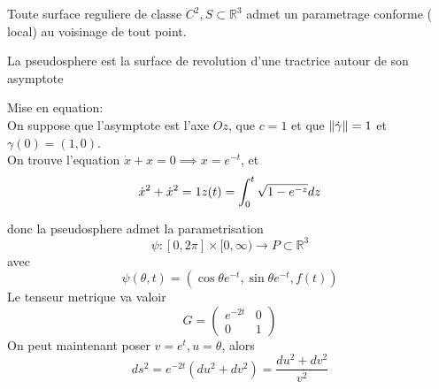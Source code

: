 \documentclass[../main.tex]{subfiles}
\begin{document}
\begin{thm}
	Toute surface reguliere de classe $C^{2}, S \subset \mathbb{R}^{3}$ admet un parametrage conforme ( local) au voisinage de tout point.
\end{thm}
\begin{defn}[Pseudosphere]
	La pseudosphere est la surface de revolution d'une tractrice autour de son asymptote
\end{defn}
Mise en equation:\\
On suppose que l'asymptote est l'axe $Oz$, que $c=1$ et que $\left\lVert \dot\gamma\right\rVert =1$ et $\gamma( 0) = ( 1,0) $.\\
On trouve l'equation $\dot x + x = 0 \implies x= e^{-t} $, et
\[ 
\dot x ^{2} + \dot x ^{2} =1\\
z( t) = \int_{ 0 }^{t } \sqrt{1- e^{-z} } dz
\]

donc la pseudosphere admet la parametrisation
\[ 
\psi: [ 0,2\pi] \times [ 0, \infty ) \to P \subset \mathbb{R}^{3} 
\]
avec
\[ 
\psi( \theta,t) = ( \cos\theta e^{-t}, \sin\theta e^{-t} ,f( t) ) 
\]
Le tenseur metrique va valoir
\[ 
G= \begin{pmatrix}
	e^{-2t} & 0\\
	0 & 1
\end{pmatrix} 
\]
On peut maintenant poser $v= e^{t} , u=\theta$, alors
\[ 
ds^{2} = e^{-2t} ( du^{2}+ dv^{2}) = \frac{du^{2}+ dv^{2}}{v^{2}}
\]
\end{document}
